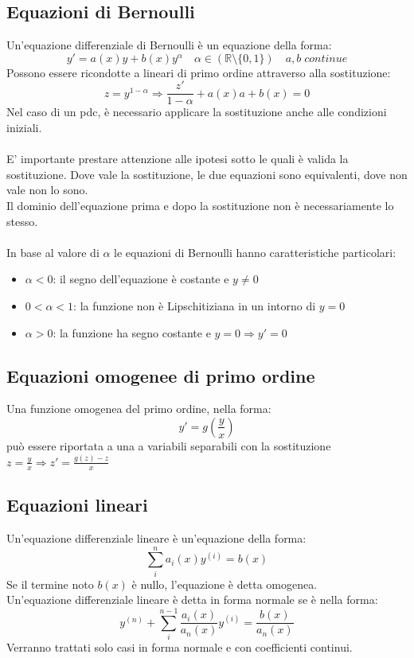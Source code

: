 \documentclass{article}
\newcommand{\R}{\mathds{R}}
\begin{document}
\subsection{Equazioni di Bernoulli}
Un'equazione differenziale di Bernoulli è un equazione della forma:
$$ y'=a(x)y+b(x)y^\alpha\quad \alpha\in(\R\setminus\{0,1\}) \quad a,b\;continue $$
Possono essere ricondotte a lineari di primo ordine attraverso alla sostituzione:
$$ z=y^{1-\alpha}\Rightarrow\frac{z'}{1-\alpha}+a(x)a+b(x)=0 $$
Nel caso di un pdc, è necessario applicare la sostituzione anche alle condizioni iniziali.\\\\
E' importante prestare attenzione alle ipotesi sotto le quali è valida la sostituzione. Dove vale la sostituzione, le due equazioni sono equivalenti, dove non vale non lo sono.\\
Il dominio dell'equazione prima e dopo la sostituzione non è necessariamente lo stesso.\\\\
In base al valore di $\alpha$ le equazioni di Bernoulli hanno caratteristiche particolari:
\begin{itemize}
    \item $\alpha<0$: il segno dell'equazione è costante e $y\neq0$
    \item $0<\alpha<1$: la funzione non è Lipschitiziana in un intorno di $y=0$
    \item $\alpha>0$: la funzione ha segno costante e $y=0\Rightarrow y'=0$
\end{itemize}


\subsection{Equazioni omogenee di primo ordine}
Una funzione omogenea del primo ordine, nella forma:
$$ y'=g\left(\frac{y}{x}\right) $$
può essere riportata a una a variabili separabili con la sostituzione $z=\frac{y}{x}\Rightarrow z'=\frac{g(z)-z}{x}$


\subsection{Equazioni lineari}
Un'equazione differenziale lineare è un'equazione della forma:
$$ \sum_i^na_i(x)y^{(i)}=b(x) $$
Se il termine noto $b(x)$ è nullo, l'equazione è detta omogenea.\\
Un'equazione differenziale lineare è detta in forma normale se è nella forma:
$$ y^{(n)}+\sum_i^{n-1}\frac{a_i(x)}{a_n(x)}y^{(i)}=\frac{b(x)}{a_n(x)} $$
Verranno trattati solo casi in forma normale e con coefficienti continui.\\\\
\end{document}

